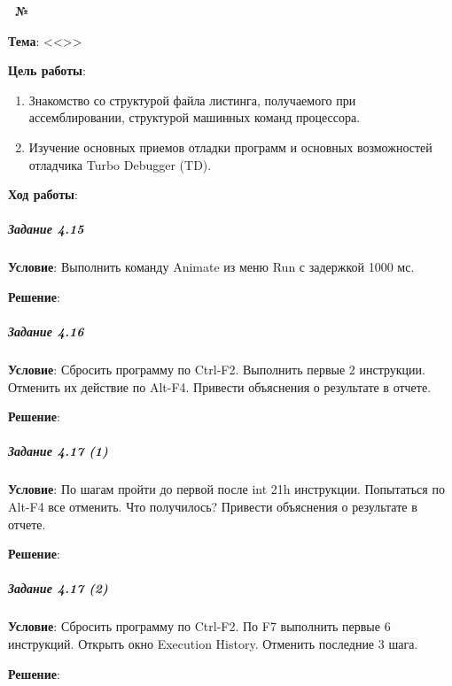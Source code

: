 \begin{center}
   \textbf{\titlePageWorkType~№\titlePageWorkNumber~\titlePageWorkPart}
\end{center}

\textbf{Тема}: <<\titlePageTopic>>

\textbf{Цель работы}: 

\begin{enumerate}
   \item Знакомство со структурой файла листинга, получаемого при ассемблировании, структурой машинных команд процессора.
   \item Изучение основных приемов отладки программ и основных возможностей отладчика Turbo Debugger (TD).
\end{enumerate}

\begin{center}
   \textbf{Ход работы}:
\end{center}

















\subparagraph{Задание 4.15}

\textbf{Условие}:
Выполнить команду Animate из меню Run с задержкой 1000 мс.

\textbf{Решение}:



\subparagraph{Задание 4.16}

\textbf{Условие}:
Сбросить программу по Ctrl-F2. Выполнить первые 2 инструкции. Отменить их действие по Alt-F4. Привести объяснения о результате в отчете.

\textbf{Решение}:



\subparagraph{Задание 4.17 (1)}

\textbf{Условие}:
По шагам пройти до первой после int 21h инструкции. Попытаться по Alt-F4 все отменить. Что получилось? Привести объяснения о результате в отчете.

\textbf{Решение}:



\subparagraph{Задание 4.17 (2)}

\textbf{Условие}:
Сбросить программу по Ctrl-F2. По F7 выполнить первые 6 инструкций. Открыть окно Execution History. Отменить последние 3 шага.

\textbf{Решение}:


